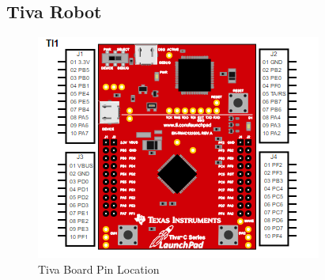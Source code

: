 \documentclass[a4paper,12pt,oneside]{book}
\begin{document}
\subsection{Tiva Robot}

   \begin{figure}[h]
        \centering
        \includegraphics[scale=0.8]{Tiva_pin}
        \caption{Tiva Board Pin Location}
      \end{figure}
\end{document}
